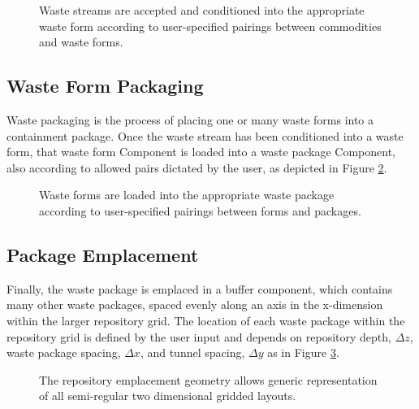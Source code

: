 \begin{figure}[htbp!]
\begin{center}
\def\svgwidth{.5\textwidth}

\end{center}
\caption[Waste stream conditioning in \Cyder.]{Waste streams are accepted and 
conditioned into the appropriate waste form according to user-specified 
pairings between commodities and waste forms.}
\label{fig:ws_conditioning}
\end{figure}

\subsection{Waste Form Packaging}

Waste packaging is the process of placing one or many waste forms into a 
containment package. Once the waste stream has been 
conditioned into a waste form, that waste form Component is loaded into a waste 
package Component, also according to allowed pairs dictated by the user, as 
depicted in Figure \ref{fig:wf_packaging}.

\begin{figure}[htbp!]
\begin{center}
\def\svgwidth{.5\textwidth}

\end{center}
\caption[Waste packaging in \Cyder.]{Waste forms are loaded into the 
appropriate waste package according to user-specified pairings between forms 
and packages.}
\label{fig:wf_packaging}
\end{figure}


\subsection{Package Emplacement}

Finally, the waste package is emplaced in a buffer component, which contains 
many other waste packages, spaced evenly along an axis in the x-dimension 
within the larger repository grid. The location of each waste package within 
the repository grid is defined by the user input and depends on repository 
depth, $\Delta z$, waste package spacing, $\Delta x$, and tunnel spacing, 
$\Delta y$ as in Figure \ref{fig:repo_layout}.

\begin{figure}[htbp!]
\begin{center}
\def\svgwidth{.5\textwidth}

\end{center}
\caption[The gridded \Cyder repository emplacement geometry.]{The \Cyder 
repository emplacement geometry allows generic representation of all semi-regular 
two dimensional gridded layouts.}
\label{fig:repo_layout}
\end{figure}

